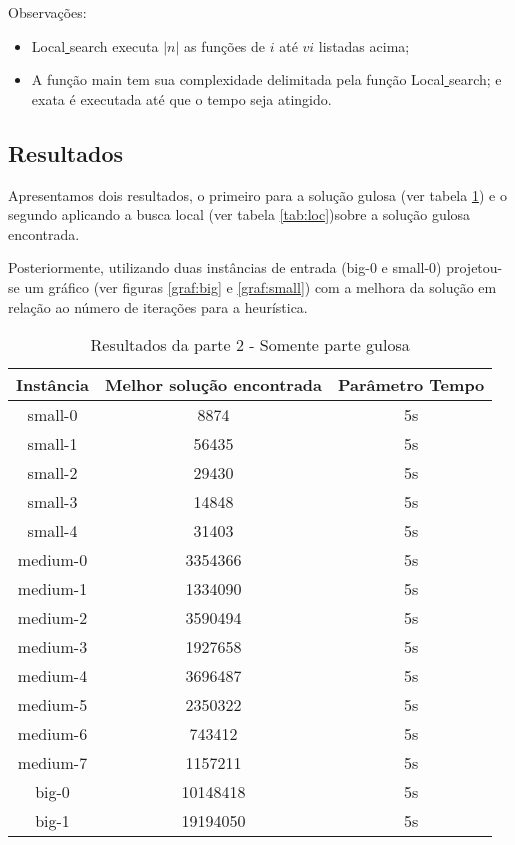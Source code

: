 \documentclass[11pt,letterpaper]{article}
\begin{document}
Observações:
\begin{itemize}
\item Local\underline{ }search executa $|n|$ as  funções de $i$ até $vi$
  listadas acima;

\item A função main tem sua complexidade delimitada pela função
  Local\underline{ }search; e exata é executada até
  que o tempo seja atingido.
\end{itemize}

\subsection{Resultados}

Apresentamos dois resultados, o primeiro para a solução gulosa (ver
tabela \ref{tab:gul}) e o segundo
aplicando a busca local (ver
tabela \ref{tab:loc})sobre a solução gulosa encontrada.

Posteriormente, utilizando duas instâncias de entrada (big-0 e
small-0) projetou-se um gráfico (ver figuras  \ref{graf:big} e \ref{graf:small}) com a melhora da
solução em relação ao número de iterações para a heurística.

\addtocounter{footnote}{1}

\begin{table}[h!]
  \begin{centering}
    \begin{tabular}{|c|c|c|}
      \hline 
      Instância & Melhor solução encontrada & Parâmetro Tempo  \tabularnewline
      \hline 
      \hline 
      small-0 & 8874 & 5s \tabularnewline %
      \hline 
      small-1 & 56435 & 5s  \tabularnewline %
      \hline 
      small-2 & 29430 & 5s \tabularnewline %
      \hline 
      small-3 & 14848 & 5s \tabularnewline %
      \hline 
      small-4 & 31403 & 5s \tabularnewline %
      \hline 
      medium-0 & 3354366 & 5s \tabularnewline %
      \hline 
      medium-1 & 1334090 & 5s \tabularnewline %
      \hline 
      medium-2 & 3590494 & 5s \tabularnewline %
      \hline 
      medium-3 & 1927658 & 5s \tabularnewline %
      \hline 
      medium-4 & 3696487 & 5s \tabularnewline %
      \hline 
      medium-5 & 2350322 & 5s \tabularnewline %
      \hline 
      medium-6 & 743412 & 5s \tabularnewline %
      \hline 
      medium-7 & 1157211 & 5s \tabularnewline %
      \hline 
      big-0 & 10148418 & 5s \tabularnewline %
      \hline 
      big-1 & 19194050 & 5s \tabularnewline %
      \hline 

    \end{tabular}
    \par\end{centering}
  \caption{Resultados da parte 2 - Somente parte gulosa}
  \label{tab:gul}
\end{table}
\end{document}

